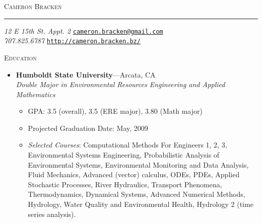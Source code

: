 \documentclass[11pt,oneside]{article}
\newcommand{\name}{Cameron Bracken}
\newcommand{\addr}{12 E 15th St. Appt. 2}
\newcommand{\phone}{707.825.6787}
\newcommand{\bigname}[1]{
	\begin{center}\Huge\scshape#1\end{center}
}
\newenvironment{ressection}[1]{
	\vspace{3pt}
	{\Large#1}
	\begin{itemize}
	\vspace{2pt}
}{
	\end{itemize}
}
\newcommand{\resitem}[1]{
	\vspace{-4pt}
	\item \begin{flushleft} #1 \end{flushleft}
}
\newcommand{\ressubitem}[1]{
	\vspace{-1pt}
	\item \begin{flushleft} #1 \end{flushleft}
}
\newcommand{\resbigitem}[3]{
	\vspace{-5pt}
	\item
	\textbf{#1}---#2 \\
	\textit{#3}
}
\newenvironment{ressubsec}[3]{
	\resbigitem{#1}{#2}{#3}
	\vspace{-2pt}
	\begin{itemize}
}{
	\end{itemize}
}
\begin{document}

\bigname{\name}

\vspace{-8pt} \rule{\textwidth}{1pt}

\vspace{-1pt} {\small \textit{\addr} \hfill \href{mailto:cameron.bracken@gmail.com}{\texttt{cameron.bracken@gmail.com}}}\\
\vspace{-1pt} {\small\textit{\phone} \hfill \href{http://cameron.bracken.bz/}{\texttt{http://cameron.bracken.bz/}}}


\vspace{8 pt}


    
    
    


\begin{ressection}{\scshape Education}

	\begin{ressubsec}{Humboldt State University}{Arcata, CA}{Double Major in Environmental Resources Engineering and Applied Mathematics}
		\ressubitem{GPA: 3.5 (overall), 3.5 (ERE major), 3.80 (Math major)}
		\ressubitem{Projected Graduation Date: May, 2009}
		\ressubitem{\begin{normalsize}\textit{Selected Courses}: 
Computational Methods For Engineers 1, 2, 3,
Environmental Systems Engineering, 
Probabilistic Analysis of Environmental Systems, 
Environmental Monitoring and Data Analysis, 
Fluid Mechanics, 
Advanced (vector) calculus, 
ODEs, 
PDEs, 
Applied Stochastic Processes,
River Hydraulics, 
Transport Phenomena, 
Thermodynamics, 
Dynamical Systems, 
Advanced Numerical Methods, 
Hydrology, 
Water Quality and Environmental Health,
Hydrology 2 (time series analysis).
\end{normalsize}}
	\end{ressubsec}

\end{ressection}
\end{document}

